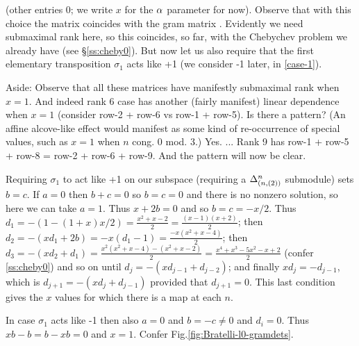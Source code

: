 (other entries 0; we write $x$ for the $\alpha$ parameter for now). 
Observe that with this choice the matrix coincides with the gram matrix \cite{ShBr}. 
Evidently we need submaximal rank here, so this coincides, so far, 
with the Chebychev problem we already have (see \S\ref{ss:cheby0}). 
But now let us also require that the first elementary transposition 
$\sigma_1$ acts like +1 (we  consider -1 later, in \ref{case-1}). 

\mdef  
Aside: Observe that all these matrices have manifestly submaximal rank when $x=1$. 
And indeed rank 6 case has another (fairly manifest) linear dependence when $x=1$ (consider row-2 + row-6 vs row-1 + row-5). Is there a pattern? 
(An affine alcove-like effect would manifest as some kind of re-occurrence of special values, such as $x=1$ when $n$ cong. 0 mod. 3.) %
Yes.
... Rank 9 has row-1 + row-5 + row-8 = row-2 + row-6 + row-9. 
And the pattern will now be clear. 


\mdef 
Requiring $\sigma_1$ to act like +1 on our subspace 
(requiring a $\Delta^{n}_{(n,(2))}$ submodule) %
sets $b=c$. 
If $a=0$ then $b+c=0$ so $b=c=0$ and there is no nonzero solution, so here we can take $a=1$. Thus $x+2b=0$ and so $b=c=-x/2$. Thus 
$d_1=-(1-(1+x)x/2) = \frac{x^2 +x-2}{2} =\frac{(x-1)(x+2)}{2}$; then 
$d_2=-(xd_1 +2b) = -x(d_1 -1) =\frac{-x(x^2 +x-4)}{2}$; then 
$d_3=-(xd_2+d_1) = \frac{x^2(x^2+x-4) - (x^2+x-2)}{2} = \frac{x^4 +x^3-5x^2-x+2}{2}$ 
(confer \ref{ss:cheby0})
and so on until $d_{j} = -(xd_{j-1} +d_{j-2})$; 
and finally $xd_{j}=-d_{j-1}$, which is 
$d_{j+1} = -(xd_{j} +d_{j-1})$ provided that $d_{j+1} =0$. 
This last condition gives the $x$ values for which there is a map at each $n$.

\mdef  \label{case-1}
In case $\sigma_1$ acts like -1 
 then also $a=0$ and $b=-c\neq 0$ and $d_i =0$. Thus $xb-b = b-xb=0$ and $x=1$. 
Confer Fig.\ref{fig:Bratelli-l0-gramdets}. 

